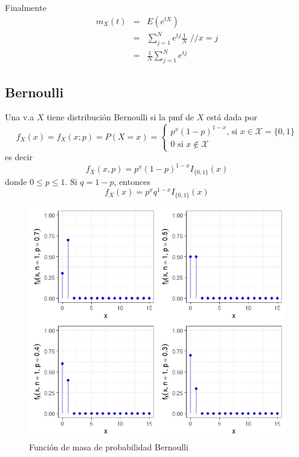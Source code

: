 \begin{i}
Finalmente
\begin{eqnarray*}
m_{X}(t) &=&E(e^{tX}) \\
&=&\sum\limits_{j=1}^{N}e^{tj}\frac{1}{N}\text{ //}x=j \\
&=&\frac{1}{N}\sum\limits_{j=1}^{N}e^{tj}
\end{eqnarray*}

\subsection{Bernoulli}

\begin{definition}
Una v.a $X$ tiene distribución Bernoulli si la pmf de $X$ está dada por 
\begin{equation*}
f_{X}(x)=f_{X}(x;p)=P(X=x)=\left\{ 
\begin{array}{l}
p^{x}(1-p)^{1-x}\text{, si }x\in \mathcal{X}=\{0,1\} \\ 
0\text{ si }x\notin \mathcal{X}
\end{array}
\right.
\end{equation*}
es decir
\begin{equation*}
f_{X}(x,p)=p^{x}(1-p)^{1-x}I_{\{0,1\}}(x)
\end{equation*}%
donde $0\leq p\leq 1.$ Si $q=1-p$, entonces
\begin{equation*}
f_{X}(x)=p^{x}q^{1-x}I_{\{0,1\}}(x)
\end{equation*}
\end{definition}

\begin{figure}[h!]
\centering
\includegraphics[scale=1]{Figuras/Bernoulli.jpeg}
\caption{Función de masa de probabilidad Bernoulli}
\end{figure}


\end{i}
